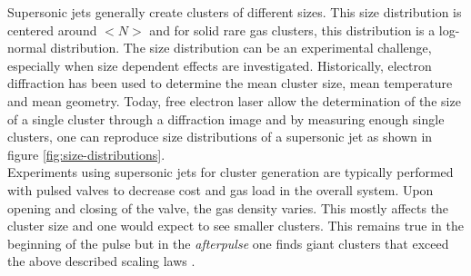 Supersonic jets generally create clusters of different sizes. This size distribution is centered around $<N>$ and for solid rare gas clusters, this distribution is a log-normal distribution. The size distribution can be an experimental challenge, especially when size dependent effects are investigated. Historically, electron diffraction \cite{Farges-1981-SurfSci,Bartell-1986-ChemRev} has been used to determine the mean cluster size, mean temperature and mean geometry. Today, free electron laser allow the determination of the size of a single cluster through a diffraction image and by measuring enough single clusters, one can reproduce size distributions of a supersonic jet as shown in figure \ref{fig:size-distributions}.\\
Experiments using supersonic jets for cluster generation are typically performed with pulsed valves to decrease cost and gas load in the overall system. Upon opening and closing of the valve, the gas density varies. This mostly affects the cluster size and one would expect to see smaller clusters. This remains true in the beginning of the pulse but in the \textit{afterpulse} one finds giant clusters that exceed the above described scaling laws \cite{Rupp-2014-JCP}.
%
%
%
%
%
